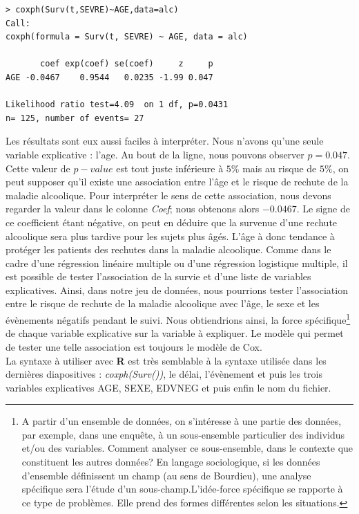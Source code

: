 \begin{lstlisting}[language=html]
> coxph(Surv(t,SEVRE)~AGE,data=alc)
Call:
coxph(formula = Surv(t, SEVRE) ~ AGE, data = alc)

       coef exp(coef) se(coef)     z     p
AGE -0.0467    0.9544   0.0235 -1.99 0.047

Likelihood ratio test=4.09  on 1 df, p=0.0431
n= 125, number of events= 27 
\end{lstlisting}
Les résultats sont eux aussi faciles à interpréter. Nous n'avons qu'une seule variable explicative : l'age.\newline
Au bout de la ligne, nous pouvons observer $p=0.047$. Cette valeur de $p-value$ est tout juste inférieure à $5\%$ mais au risque de $5\%$, on peut supposer qu'il existe une association entre l'âge et le risque de rechute de la maladie alcoolique.\newline
Pour interpréter le sens de cette association, nous devons regarder la valeur dans le colonne \textit{Coef}; nous obtenons alors $-0.0467$. Le signe de ce coefficient étant négative, on peut en déduire que la survenue d'une rechute alcoolique sera plus tardive pour les sujets plus âgés. L'âge à donc tendance à protéger les patients des rechutes dans la maladie alcoolique.\newline
Comme dans le cadre d'une régression linéaire multiple ou d'une régression logistique multiple, il est possible de tester l'association de la survie et d'une liste de variables explicatives. Ainsi, dans notre jeu de données, nous pourrions tester l'association entre le risque de rechute de la maladie alcoolique avec l'âge, le sexe et les évènements négatifs pendant le suivi. Nous obtiendrions ainsi, la force spécifique\footnote{A partir d'un ensemble de données,  on s'intéresse à une partie des données, par exemple, dans une enquête, à un sous-ensemble particulier des individus et/ou des variables. Comment analyser ce sous-ensemble, dans le contexte que constituent les autres données? En  langage sociologique,  si  les données d'ensemble définissent un champ (au sens de Bourdieu), une analyse spécifique sera l'étude d'un sous-champ.L'idée-force spécifique se rapporte à ce type de problèmes. Elle prend des formes différentes selon les situations.} de chaque variable explicative sur la variable à expliquer.\newline
Le modèle qui permet de tester une telle association est toujours le modèle de Cox.\newline
\\
La syntaxe à utiliser avec \textbf{R} est très semblable à la syntaxe utilisée dans les dernières diapositives : \textit{coxph(Surv())}, le délai, l'évènement et puis les trois variables explicatives AGE, SEXE, EDVNEG et puis enfin le nom du fichier.

